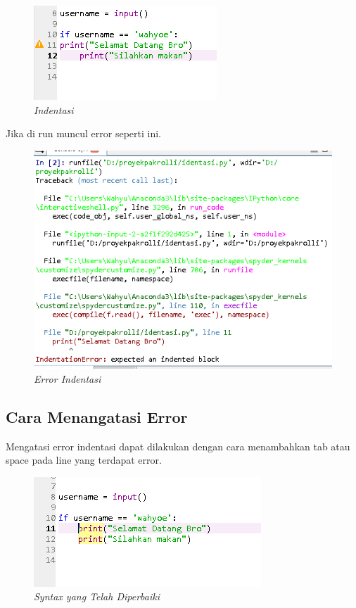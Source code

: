 \begin{figure}[H]
    \centering
    \includegraphics[scale=0.5]{figures/b6}
    \caption{\textit{Indentasi}}
    \label{Indentasi}
\end{figure}
Jika di run muncul error seperti ini.
\begin{figure}[H]
    \centering
    \includegraphics[scale=0.4]{figures/b7}
    \caption{\textit{Error Indentasi}}
    \label{Error Indentasi}
\end{figure}


\subsection{Cara Menangatasi Error}
Mengatasi error indentasi dapat dilakukan dengan cara menambahkan tab atau space pada line yang terdapat error.

\begin{figure}[H]
    \centering
    \includegraphics[scale=0.7]{figures/b8}
    \caption{\textit{Syntax yang Telah Diperbaiki}}
    \label{Syntax Error}
\end{figure}